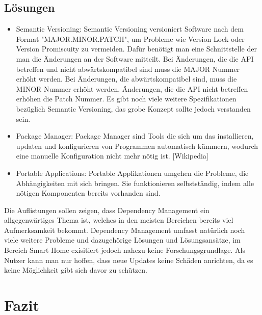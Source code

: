 \subsection{Lösungen}
\begin{itemize}
 \item Semantic Versioning: Semantic Versioning versioniert Software nach dem Format "MAJOR.MINOR.PATCH", um Probleme wie Version Lock 
oder Version Promiscuity zu vermeiden. Dafür benötigt 
man eine Schnittstelle der man die Änderungen an der Software mitteilt. Bei Änderungen, die die API betreffen und nicht abwärtskompatibel
sind muss die MAJOR Nummer erhöht werden. Bei Änderungen, die abwärtskompatibel sind, muss die MINOR Nummer erhöht werden. 
Änderungen, die die API nicht betreffen erhöhen die Patch Nummer. Es gibt noch viele weitere Spezifikationen bezüglich Semantic
Versioning, das grobe Konzept sollte jedoch verstanden sein. 
\item Package Manager: Package Manager sind Tools die sich um das installieren, updaten und konfigurieren von Programmen automatisch
kümmern, wodurch eine manuelle Konfiguration nicht mehr nötig ist. [Wikipedia]
\item Portable Applications: Portable Applikationen umgehen die Probleme, die
Abhängigkeiten mit sich bringen. Sie funktionieren selbstständig,
indem alle nötigen Komponenten bereits vorhanden sind.
\end{itemize}

Die Auflistungen sollen zeigen, dass Dependency Management ein allgegenwärtiges Thema ist, welches in den meisten Bereichen bereits
viel Aufmerksamkeit bekommt. Dependency Management umfasst natürlich noch viele weitere Probleme und dazugehörige Lösungen und Lösungsansätze,
im Bereich Smart Home exisitiert jedoch nahezu keine Forschungsgrundlage. Als Nutzer kann man nur hoffen, dass neue Updates keine Schäden anrichten, 
da es keine Möglichkeit gibt sich davor zu schützen. 


\section{Fazit}

